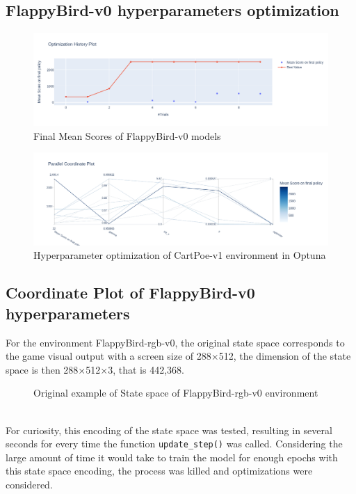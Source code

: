 \documentclass[11pt,a4paper,twocolumn]{IEEEtran}
\begin{document}
		\subsection{\textbf{FlappyBird-v0 hyperparameters optimization}}\vspace*{-.5cm}
		\begin{figure}[h]
			\centering\includegraphics[width=1\linewidth]{../imgs/optuna_fbv0_1}\vspace*{-.7cm}
			\caption{Final Mean Scores of FlappyBird-v0 models}
			\label{fig:fbv01opt}
		\end{figure}
	\begin{figure}[h]
		\centering\includegraphics[width=1\linewidth]{../imgs/optuna_fbv0_2}\vspace*{-.0cm}
		\caption{Hyperparameter optimization of CartPoe-v1 environment in Optuna}
		\label{fig:fbv02opt}
	\end{figure}
		\newpage
		\subsection{\textbf{Coordinate Plot of FlappyBird-v0 hyperparameters}}
		\label{section:aprgb}
		For the environment FlappyBird-rgb-v0, the original state space corresponds to the game visual output with a screen size of 288$\times$512, the dimension of the state space is then 288$\times$512$\times$3, that is 442,368.\vspace*{-1cm}\\
		\begin{figure}[h]
			\centering
			\vspace*{-.7cm}
			\caption{Original example of State space of FlappyBird-rgb-v0 environment}
		\end{figure}\\
		For curiosity, this encoding of the state space was tested, resulting in several seconds for every time the function \texttt{update\_step()} was called. Considering the large amount of time it would take to train the model for enough epochs with this state space encoding, the process was killed and optimizations were considered.\medskip\\
		
\end{document}
